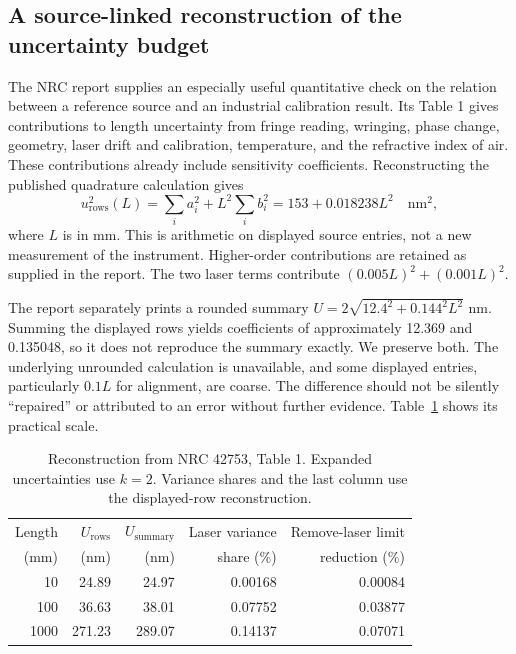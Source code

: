 \documentclass[11pt,a4paper]{article}
\begin{document}
\subsection{A source-linked reconstruction of the uncertainty budget}
The NRC report supplies an especially useful quantitative check on the relation between a reference source and an industrial calibration result. Its Table 1 gives contributions to length uncertainty from fringe reading, wringing, phase change, geometry, laser drift and calibration, temperature, and the refractive index of air. These contributions already include sensitivity coefficients. Reconstructing the published quadrature calculation gives
\begin{equation}\label{eq:budget}
 u_{\mathrm{rows}}^2(L)=\sum_i a_i^2+L^2\sum_i b_i^2
 =153+0.018238L^2\quad\mathrm{nm}^2,
\end{equation}
where $L$ is in mm. This is arithmetic on displayed source entries, not a new measurement of the instrument. Higher-order contributions are retained as supplied in the report. The two laser terms contribute $(0.005L)^2+(0.001L)^2$.

The report separately prints a rounded summary $U=2\sqrt{12.4^2+0.144^2L^2}$ nm. Summing the displayed rows yields coefficients of approximately 12.369 and 0.135048, so it does not reproduce the summary exactly. We preserve both. The underlying unrounded calculation is unavailable, and some displayed entries, particularly $0.1L$ for alignment, are coarse. The difference should not be silently ``repaired'' or attributed to an error without further evidence. Table~\ref{tab:budget} shows its practical scale.

\begin{table}[htbp]\centering\small
\caption{Reconstruction from NRC 42753, Table 1. Expanded uncertainties use $k=2$. Variance shares and the last column use the displayed-row reconstruction.}\label{tab:budget}
\begin{tabular}{rrrrr}\toprule
Length & $U_{\mathrm{rows}}$ & $U_{\mathrm{summary}}$ & Laser variance & Remove-laser limit\\
(mm) & (nm) & (nm) & share (\%) & reduction (\%)\\\midrule
10 & 24.89 & 24.97 & 0.00168 & 0.00084\\
100 & 36.63 & 38.01 & 0.07752 & 0.03877\\
1000 & 271.23 & 289.07 & 0.14137 & 0.07071\\\bottomrule
\end{tabular}
\end{table}
\end{document}
